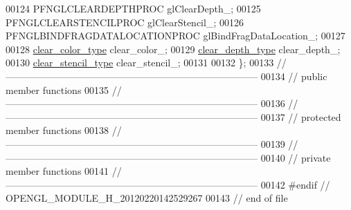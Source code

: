 \begin{DoxyCode}
00124     PFNGLCLEARDEPTHPROC             glClearDepth\_;
00125     PFNGLCLEARSTENCILPROC           glClearStencil\_;
00126     PFNGLBINDFRAGDATALOCATIONPROC   glBindFragDataLocation\_;
00127 
00128     \hyperlink{classhryky_1_1color_1_1_rgba}{clear_color_type}                clear\_color\_;
00129     \hyperlink{namespacehryky_1_1opengl_a5d4a0c96ecaa596a64f1efed8a51c089}{clear_depth_type}                clear\_depth\_;
00130     \hyperlink{namespacehryky_1_1opengl_a7340c1159eebfb6a57358d75a1b0629a}{clear_stencil_type}              clear\_stencil\_;
00131 
00132 \};
00133 \textcolor{comment}{//
      ------------------------------------------------------------------------------}
00134 \textcolor{comment}{// public member functions}
00135 \textcolor{comment}{//
      ------------------------------------------------------------------------------}
00136 \textcolor{comment}{//
      ------------------------------------------------------------------------------}
00137 \textcolor{comment}{// protected member functions}
00138 \textcolor{comment}{//
      ------------------------------------------------------------------------------}
00139 \textcolor{comment}{//
      ------------------------------------------------------------------------------}
00140 \textcolor{comment}{// private member functions}
00141 \textcolor{comment}{//
      ------------------------------------------------------------------------------}
00142 \textcolor{preprocessor}{#endif // OPENGL\_MODULE\_H\_20120220142529267}
00143 \textcolor{preprocessor}{}\textcolor{comment}{// end of file}
\end{DoxyCode}
